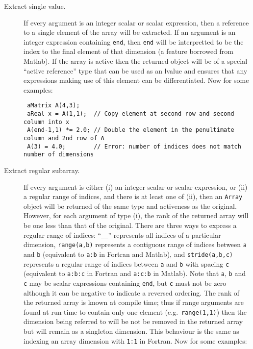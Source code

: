 \documentclass[a4,oneside]{book}
\def\codesize{\small}
\def\code#1{{\codesize\texttt{#1}}}
\begin{document}
\begin{description}
\item[Extract single value.] If every argument is an integer scalar or
  scalar expression, then a reference to a single element of the array
  will be extracted. If an argument is an integer expression
  containing \code{end}, then \code{end} will be interpretted to be
  the index to the final element of that dimension (a feature borrowed
  from Matlab). If the array is active then the returned object will
  be of a special ``active reference'' type that can be used as an
  lvalue and ensures that any expressions making use of this element
  can be differentiated. Now for some examples:
  \begin{lstlisting}
 aMatrix A(4,3);
 aReal x = A(1,1);  // Copy element at second row and second column into x
 A(end-1,1) *= 2.0; // Double the element in the penultimate column and 2nd row of A
 A(3) = 4.0;        // Error: number of indices does not match number of dimensions
  \end{lstlisting}
\item[Extract regular subarray.] If every argument is either (i) an
  integer scalar or scalar expression, or (ii) a regular range of
  indices, and there is at least one of (ii), then an \code{Array}
  object will be returned of the same type and activeness as the
  original. However, for each argument of type (i), the rank of the
  returned array will be one less than that of the original. There are
  three ways to express a regular range of indices: ``\code{\_\_}''
  represents all indices of a particular dimension, \code{range(a,b)}
  represents a contiguous range of indices between \code{a} and
  \code{b} (equivalent to \code{a:b} in Fortran and Matlab), and
  \code{stride(a,b,c)} represents a regular range of indices between
  \code{a} and \code{b} with spacing \code{c} (equivalent to
  \code{a:b:c} in Fortran and \code{a:c:b} in Matlab). Note that
  \code{a}, \code{b} and \code{c} may be scalar expressions containing
  \code{end}, but \code{c} must not be zero although it can be
  negative to indicate a reversed ordering. The rank of the returned
  array is known at compile time; thus if range arguments are found at
  run-time to contain only one element (e.g.\ \code{range(1,1)}) then
  the dimension being referred to will be not be removed in the
  returned array but will remain as a singleton dimension. This
  behaviour is the same as indexing an array dimension with \code{1:1}
  in Fortran. Now for some examples:
\begin{lstlisting}

\end{lstlisting}
\end{description}
\end{document}
